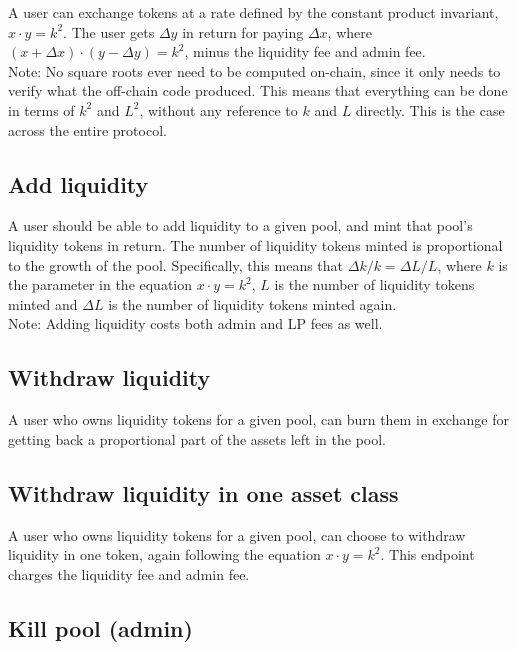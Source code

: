 \documentclass{article}
\begin{document}
A user can exchange tokens at a rate defined by the constant product invariant,
$x \cdot y = k^2$. The user gets $\Delta y$ in return for paying $\Delta x$,
where $(x + \Delta x) \cdot (y - \Delta y) = k^2$, minus the liquidity fee and
admin fee. \\

Note: No square roots ever need to be computed on-chain, since it only needs to
verify what the off-chain code produced. This means that everything can be done
in terms of $k^2$ and $L^2$, without any reference to $k$ and $L$ directly. This
is the case across the entire protocol.

\subsection*{Add liquidity}

A user should be able to add liquidity to a given pool, and mint that pool’s
liquidity tokens in return. The number of liquidity tokens minted is
proportional to the growth of the pool. Specifically, this means that $\Delta k
/ k = \Delta L / L$, where $k$ is the parameter in the equation $x \cdot y =
k^2$, $L$ is the number of liquidity tokens minted and $\Delta L$ is the number
of liquidity tokens minted again. \\

Note: Adding liquidity costs both admin and LP fees as well.


\subsection*{Withdraw liquidity}

A user who owns liquidity tokens for a given pool, can burn them in exchange for
getting back a proportional part of the assets left in the pool.

\subsection*{Withdraw liquidity in one asset class}

A user who owns liquidity tokens for a given pool, can choose to withdraw
liquidity in one token, again following the equation $x \cdot y = k^2$. This
endpoint charges the liquidity fee and admin fee.


\subsection*{Kill pool (admin)}
\end{document}
